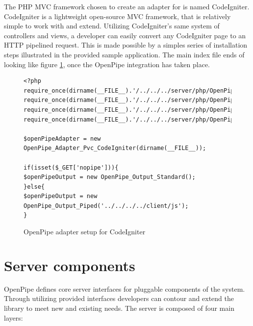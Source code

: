 \documentclass[12pt]{report}
\begin{document}
The PHP MVC framework chosen to create an adapter for is named CodeIgniter. CodeIgniter is a lightweight open-source MVC framework, that is relatively simple to work with and extend. Utilizing CodeIgniter’s same system of controllers and views, a developer can easily convert any CodeIgniter page to an HTTP pipelined request. This is made possible by a simples series of installation steps illustrated in the provided sample application. The main index file ends of looking like figure \ref{fig:codeIgniterPvcCode}, once the OpenPipe integration has taken place.

\begin{figure}[H]
\label{fig:codeIgniterPvcCode}
\begin{lstlisting}
<?php
require_once(dirname(__FILE__).'/../../../server/php/OpenPipe/Adapter/Pvc/CodeIgniter.php');
require_once(dirname(__FILE__).'/../../../server/php/OpenPipe/Output/Piped.php');
require_once(dirname(__FILE__).'/../../../server/php/OpenPipe/Output/Standard.php');
require_once(dirname(__FILE__).'/../../../server/php/OpenPipe/Runner.php');

$openPipeAdapter = new OpenPipe_Adapter_Pvc_CodeIgniter(dirname(__FILE__));

if(isset($_GET['nopipe'])){
$openPipeOutput = new OpenPipe_Output_Standard();	
}else{
$openPipeOutput = new OpenPipe_Output_Piped('../../../../client/js');	
}
\end{lstlisting}
\caption{OpenPipe adapter setup for CodeIgniter}
\end{figure}


\section{Server components}
OpenPipe defines core server interfaces for pluggable components of the system. Through utilizing provided interfaces developers can contour and extend the library to meet new and existing needs. The server is composed of four main layers:
\end{document}
